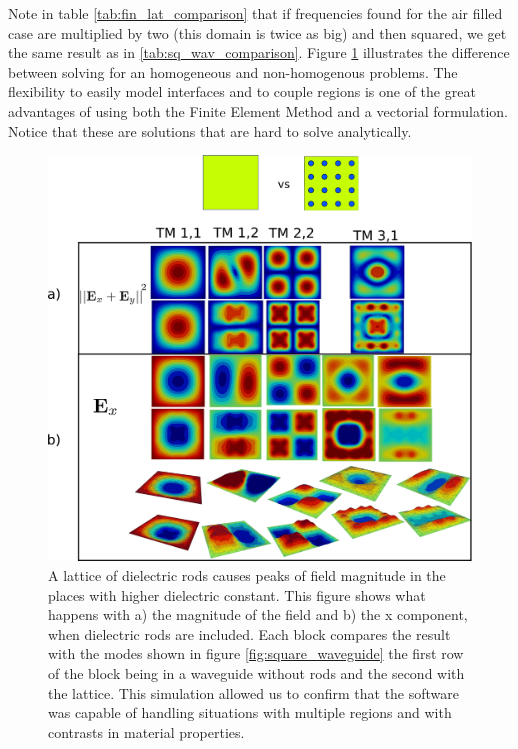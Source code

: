 Note in table \ref{tab:fin_lat_comparison} that if frequencies found for the air filled case are multiplied by two (this domain is twice as big) and then squared, we get the same result as in   \ref{tab:sq_wav_comparison}. 
Figure \ref{fig:fin_lat_waveguide} illustrates the difference between solving for an homogeneous and non-homogenous problems. The flexibility to easily model interfaces and to couple regions is one of the great advantages of using both the Finite Element Method and a vectorial formulation. Notice that these are solutions that are hard to solve analytically.

\begin{figure}
\centering
\includegraphics[scale=0.1]{./img/finite_lattice.pdf}
\caption{A lattice of dielectric rods causes peaks of field magnitude in the places with higher dielectric constant. This figure shows what happens with a) the magnitude of the field and b) the x component, when dielectric rods are included. Each block compares the result with the modes shown in figure \ref{fig:square_waveguide} the first row of the block being in a waveguide without rods and the second with the lattice. This simulation allowed us to confirm that the software was capable of handling situations with multiple regions and with contrasts in material properties.}
\label{fig:fin_lat_waveguide}
\end{figure}

